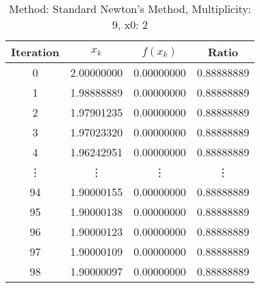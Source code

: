 \begin{table}
\centering
\caption{Method: Standard Newton's Method, Multiplicity: 9, x0: 2}
\label{tab:table_Standard_Newton's_Method_9_2}
\begin{tabular}{c c c c}
\toprule
Iteration &      $x_k$ &   $f(x_k)$ &      Ratio \\
\midrule
        0 & 2.00000000 & 0.00000000 & 0.88888889 \\
        1 & 1.98888889 & 0.00000000 & 0.88888889 \\
        2 & 1.97901235 & 0.00000000 & 0.88888889 \\
        3 & 1.97023320 & 0.00000000 & 0.88888889 \\
        4 & 1.96242951 & 0.00000000 & 0.88888889 \\
   \vdots &     \vdots &     \vdots &     \vdots \\
       94 & 1.90000155 & 0.00000000 & 0.88888889 \\
       95 & 1.90000138 & 0.00000000 & 0.88888889 \\
       96 & 1.90000123 & 0.00000000 & 0.88888889 \\
       97 & 1.90000109 & 0.00000000 & 0.88888889 \\
       98 & 1.90000097 & 0.00000000 & 0.88888889 \\
\bottomrule
\end{tabular}
\end{table}

